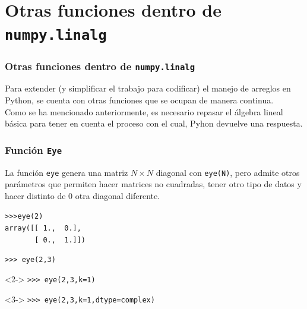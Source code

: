\section{Otras funciones dentro de \texttt{numpy.linalg}}
\begin{frame}
\frametitle{Otras funciones dentro de \texttt{numpy.linalg}}
Para extender (y simplificar el trabajo para codificar) el manejo de arreglos en Python, se cuenta con otras funciones que se ocupan de manera continua.
\\
\bigskip
Como se ha mencionado anteriormente, es necesario repasar el álgebra lineal básica para tener en cuenta el proceso con el cual, Pyhon devuelve una respuesta.
\end{frame}
\begin{frame}[fragile]
\frametitle{Función \texttt{Eye}}
La función \texttt{eye} genera una matriz $N \times	N$ diagonal con \verb|eye(N)|, pero admite otros parámetros que permiten hacer matrices no cuadradas, tener otro tipo de datos y hacer distinto de $0$ otra diagonal diferente.
\begin{exampleblock}{}
\verb|>>>eye(2)| \\
\pause
\verb|array([[ 1.,  0.],| \\
\verb|       [ 0.,  1.]])|
\end{exampleblock}
\end{frame}
\begin{frame}[fragile]
\begin{exampleblock}{}
\verb|>>> eye(2,3)| \\
\pause
{}
\end{exampleblock}
\begin{exampleblock}{}<2->
\verb|>>> eye(2,3,k=1)| \\
\end{exampleblock}
\begin{exampleblock}{}<3->
\verb|>>> eye(2,3,k=1,dtype=complex)| \\
\end{exampleblock}
\end{frame}

